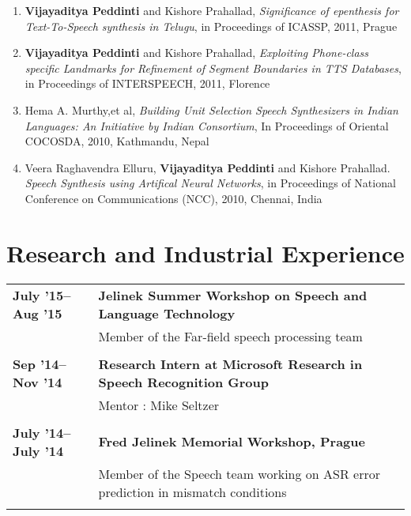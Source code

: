 \documentclass[margin,line,pifont,palatino,courier]{res}
\begin{document}
\begin{resume}
\begin{enumerate}
\item \textbf{Vijayaditya Peddinti} and Kishore Prahallad,
\textit{Significance of epenthesis for Text-To-Speech synthesis in Telugu}, in Proceedings of ICASSP, 2011, Prague

\item \textbf{Vijayaditya Peddinti} and Kishore Prahallad,
\textit{Exploiting Phone-class specific Landmarks for Refinement of Segment Boundaries in TTS Databases}, in Proceedings of INTERSPEECH, 2011, Florence

\item Hema A. Murthy,et al, 
\textit{Building Unit Selection Speech Synthesizers in Indian Languages: An Initiative by Indian Consortium}, In Proceedings of Oriental COCOSDA, 2010, Kathmandu, Nepal

\item Veera Raghavendra Elluru, \textbf{Vijayaditya Peddinti} and Kishore Prahallad.
\textit{Speech Synthesis using Artifical Neural Networks}, in Proceedings of National Conference on Communications (NCC), 2010, Chennai, India
\end{enumerate}
\section{\sc Research and Industrial Experience}

\begin{longtable}{@{}p{1.2in}p{3.8in}}

\textbf{July '15--Aug '15} & \textbf{Jelinek Summer Workshop on Speech and Language Technology} \\
& Member of the Far-field speech processing team \\
&\\

\textbf{Sep '14--Nov '14} & \textbf{Research Intern at Microsoft Research in Speech Recognition Group} \\
& Mentor : Mike Seltzer \\
&\\

\textbf{July '14--July '14} & \textbf{Fred Jelinek Memorial Workshop, Prague} \\
& Member of the Speech team working on ASR error prediction in mismatch conditions \\
&\\


\end{longtable}
\end{resume}
\end{document}
